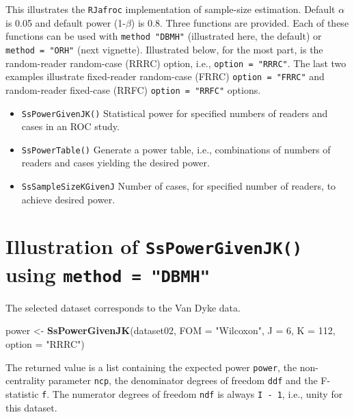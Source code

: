 \documentclass[]{book}
\newenvironment{Shaded}{\begin{snugshade}}{\end{snugshade}}
\newcommand{\DataTypeTok}[1]{\textcolor[rgb]{0.13,0.29,0.53}{#1}}
\newcommand{\DecValTok}[1]{\textcolor[rgb]{0.00,0.00,0.81}{#1}}
\newcommand{\KeywordTok}[1]{\textcolor[rgb]{0.13,0.29,0.53}{\textbf{#1}}}
\newcommand{\NormalTok}[1]{#1}
\newcommand{\StringTok}[1]{\textcolor[rgb]{0.31,0.60,0.02}{#1}}
\providecommand{\tightlist}{%
  \setlength{\itemsep}{0pt}\setlength{\parskip}{0pt}}
\begin{document}
This illustrates the \texttt{RJafroc} implementation of sample-size estimation. Default \(\alpha\) is 0.05 and default power (1-\(\beta\)) is 0.8. Three functions are provided. Each of these functions can be used with \texttt{method\ "DBMH"} (illustrated here, the default) or \texttt{method\ =\ "ORH"} (next vignette). Illustrated below, for the most part, is the random-reader random-case (RRRC) option, i.e., \texttt{option\ =\ "RRRC"}. The last two examples illustrate fixed-reader random-case (FRRC) \texttt{option\ =\ "FRRC"} and random-reader fixed-case (RRFC) \texttt{option\ =\ "RRFC"} options.

\begin{itemize}
\tightlist
\item
  \texttt{SsPowerGivenJK()}
  Statistical power for specified numbers of readers and cases in an ROC study.
\item
  \texttt{SsPowerTable()}
  Generate a power table, i.e., combinations of numbers of readers and cases yielding the desired power.
\item
  \texttt{SsSampleSizeKGivenJ}
  Number of cases, for specified number of readers, to achieve desired power.
\end{itemize}

\hypertarget{illustration-of-sspowergivenjk-using-method-dbmh}{%
\section{\texorpdfstring{Illustration of \texttt{SsPowerGivenJK()} using \texttt{method\ =\ "DBMH"}}{Illustration of SsPowerGivenJK() using method = "DBMH"}}\label{illustration-of-sspowergivenjk-using-method-dbmh}}

The selected dataset corresponds to the Van Dyke data.

\begin{Shaded}
\begin{Highlighting}[]
\NormalTok{power <-}\StringTok{ }\KeywordTok{SsPowerGivenJK}\NormalTok{(dataset02, }\DataTypeTok{FOM =} \StringTok{"Wilcoxon"}\NormalTok{, }\DataTypeTok{J =} \DecValTok{6}\NormalTok{, }\DataTypeTok{K =} \DecValTok{112}\NormalTok{, }\DataTypeTok{option =} \StringTok{"RRRC"}\NormalTok{)}
\end{Highlighting}
\end{Shaded}

The returned value is a list containing the expected power \texttt{power}, the non-centrality parameter \texttt{ncp}, the denominator degrees of freedom \texttt{ddf} and the F-statistic \texttt{f}. The numerator degrees of freedom \texttt{ndf} is always \texttt{I\ -\ 1}, i.e., unity for this dataset.
\end{document}
